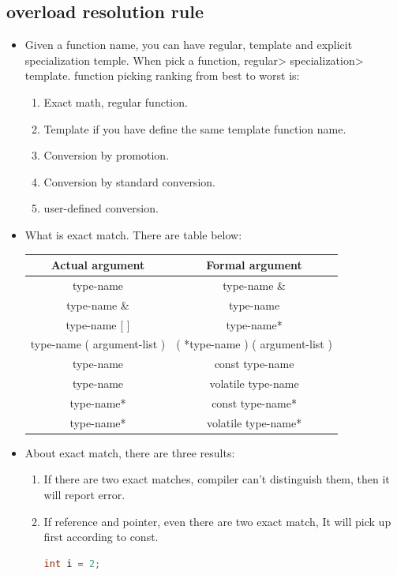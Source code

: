 \documentclass[a4paper,11pt,twoside]{book}
\newcommand{\tophline}{\hline }
\newcommand{\bottomhline}{\\ \hline }
\newcommand{\tophline}{ }
\newcommand{\bottomhline}{ }
\begin{document}
\subsection{overload resolution rule}
\begin{itemize}
	\item Given a function name, you can have regular, template and explicit specialization temple. When pick a function, regular> specialization> template. function picking ranking from best to worst is:
	\begin{enumerate}
		\item Exact math, regular function.
		\item Template if you have define the same template function name.
		\item Conversion by promotion.
		\item Conversion by standard conversion.
		\item user-defined conversion.
	\end{enumerate}

\item What is exact match. There are table below:

\begin{center}
	\begin{tabular}{|c|c|}
	\tophline
	Actual argument & Formal argument \\
	\tophline
	type-name & type-name \& \\
	\tophline
	type-name \& & type-name \\ \tophline
	type-name [ ] &  type-name* \\ \tophline
	type-name ( argument-list ) & ( *type-name ) ( argument-list ) \\ \tophline
	type-name  & const type-name \\ \tophline
	type-name  &  volatile  type-name \\ \tophline
	type-name*  & const type-name*  \\ \tophline
	type-name*  & volatile  type-name*  \bottomhline
	\end{tabular}
\end{center}

	\item About exact match, there are three results:
	\begin{enumerate}
		\item If there are two exact matches, compiler can't distinguish them, then it will report error.
		
		\item If reference and pointer, even there are two exact match, It will pick up first according to const.
\begin{lstlisting}[frame=single, language=c++]
int i = 2;


\end{lstlisting}
\end{enumerate}
\end{itemize}
\end{document}
